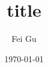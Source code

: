 \documentclass[12pt]{report}       %
\title{title}                       %
\author{Fei Gu}
\date{\today}
\begin{document}
\maketitle


\section{}\label{sec:}



    
\end{document}
